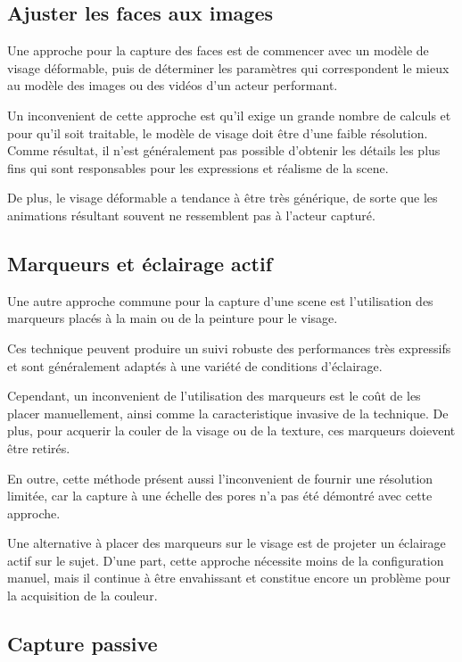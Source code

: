 \documentclass[a4paper,12pt]{article}
\begin{document}
\subsection{Ajuster les faces aux images}
Une approche pour la capture des faces est de commencer avec un modèle
de visage déformable, puis de déterminer les paramètres qui
correspondent le mieux au modèle des images ou des vidéos d'un acteur
performant.

Un inconvenient de cette approche est qu'il exige un grande nombre de calculs et pour qu'il soit traitable, le modèle de visage doit être d'une faible résolution.
Comme résultat, il n'est généralement pas possible d'obtenir les
détails les plus fins qui sont responsables pour les expressions et
réalisme de la scene.

De plus, le visage déformable a tendance à être très générique, de
sorte que les animations résultant souvent ne ressemblent pas à
l'acteur capturé.

\subsection{Marqueurs et éclairage actif}

Une autre approche commune pour la capture d'une scene est
l'utilisation des marqueurs placés à la main ou de la peinture pour le
visage.

Ces technique peuvent produire un suivi robuste des performances très
expressifs et sont généralement adaptés à une variété de conditions
d'éclairage.

Cependant, un inconvenient de l'utilisation des marqueurs est le coût
de les placer manuellement, ainsi comme la caracteristique invasive de
la technique. De plus, pour acquerir la couler de la visage ou de la
texture, ces marqueurs doievent être retirés. 

En outre, cette méthode présent aussi l'inconvenient de fournir une
résolution limitée, car la capture à une échelle des pores n'a pas été
démontré avec cette approche. 

Une alternative à placer des marqueurs sur le visage est de projeter
un éclairage actif sur le sujet. D'une part, cette approche nécessite
moins de la configuration manuel, mais il continue à être envahissant
et constitue encore un problème pour la acquisition de la couleur. 

\subsection{Capture passive }
\end{document}
